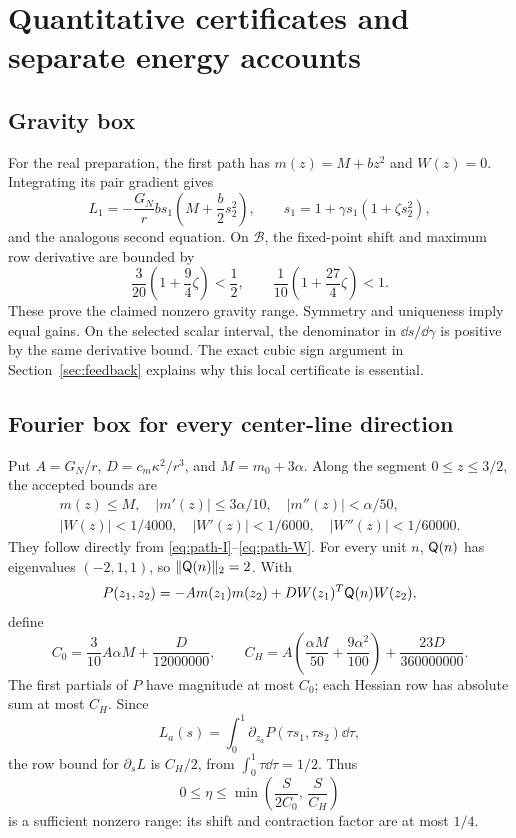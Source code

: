 \section{Quantitative certificates and separate energy accounts}\label{app:bounds}
\subsection{Gravity box}
For the real preparation, the first path has
\(m(z)=M+bz^2\) and \(W(z)=0\). Integrating its pair gradient gives
\[
 L_1=-\frac{G_N}{r}b s_1\left(M+\frac b2s_2^2\right),\qquad
 s_1=1+\gamma s_1(1+\zeta s_2^2),
\]
and the analogous second equation. On \(\mathcal B\), the fixed-point shift and maximum row derivative are bounded by
\begin{equation}
 \frac3{20}\left(1+\frac94\zeta\right)<\frac12,\qquad
 \frac1{10}\left(1+\frac{27}{4}\zeta\right)<1.
 \label{eq:gravity-certificate}
\end{equation}
These prove the claimed nonzero gravity range. Symmetry and uniqueness imply equal gains. On the selected scalar interval, the denominator in \(\dd s/\dd\gamma\) is positive by the same derivative bound. The exact cubic sign argument in Section~\ref{sec:feedback} explains why this local certificate is essential.

\subsection{Fourier box for every center-line direction}
Put \(A=G_N/r\), \(D=c_m\kappa^2/r^3\), and \(M=m_0+3\alpha\). Along the segment \(0\le z\le3/2\), the accepted bounds \cite{GM02,GM03} are
\begin{equation}
\begin{gathered}
 m(z)\le M,\quad |m'(z)|\le3\alpha/10,\quad |m''(z)|<\alpha/50,\\
 |W(z)|<1/4000,\quad |W'(z)|<1/6000,\quad |W''(z)|<1/60000.
\end{gathered}\label{eq:path-bounds}
\end{equation}
They follow directly from \eqref{eq:path-I}--\eqref{eq:path-W}. For every unit \(n\), \(\mathsf Q(n)\) has eigenvalues \((-2,1,1)\), so \(\|\mathsf Q(n)\|_2=2\). With
\[
 P(z_1,z_2)=-A m(z_1)m(z_2)+D W(z_1)^T\mathsf Q(n)W(z_2),
\]
define
\begin{equation}
 C_0=\frac3{10}A\alpha M+\frac{D}{12000000},\qquad
 C_H=A\left(\frac{\alpha M}{50}+\frac{9\alpha^2}{100}\right)
       +\frac{23D}{360000000}.
 \label{eq:CH}
\end{equation}
The first partials of \(P\) have magnitude at most \(C_0\); each Hessian row has absolute sum at most \(C_H\). Since
\[
 L_a(s)=\int_0^1\partial_{z_a}P(\tau s_1,\tau s_2)\dd\tau,
\]
the row bound for \(\partial_sL\) is \(C_H/2\), from \(\int_0^1\tau\dd\tau=1/2\). Thus
\[
 0\le\eta\le \min\left(\frac{S}{2C_0},\,\frac{S}{C_H}\right)
\]
is a sufficient nonzero range: its shift and contraction factor are at most \(1/4\).

